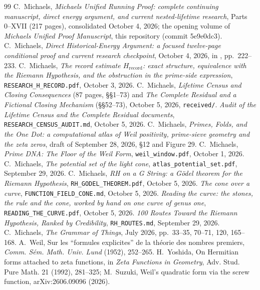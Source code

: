 \documentclass[11pt]{article}
\theoremstyle{definition}
\theoremstyle{remark}
\newcommand{\Hrec}{H_{\mathrm{record}}}
\begin{document}
\begin{thebibliography}{99}\small
{} C.~Michaels, \emph{Michaels Unified Running Proof: complete continuing manuscript, direct energy argument, and current nested-lifetime research}, Parts 0--XVII (217 pages), consolidated October 4, 2026; the opening volume of \emph{Michaels Unified Proof Manuscript}, this repository (commit 5e9e0dc3).
 C.~Michaels, \emph{Direct Historical-Energy Argument: a focused twelve-page conditional proof and current research checkpoint}, October 4, 2026, in \cite{running}, pp.\ 222--233.
 C.~Michaels, \emph{The record estimate $\Hrec$: exact structure, equivalence with the Riemann Hypothesis, and the obstruction in the prime-side expression}, \texttt{RESEARCH\_H\_RECORD.pdf}, October 3, 2026.
 C.~Michaels, \emph{Lifetime Census and Closing Consequences} (87 pages, \S\S1--73) and \emph{The Complete Residual and a Fictional Closing Mechanism} (\S\S52--73), October 5, 2026, \texttt{received/}.
 \emph{Audit of the Lifetime Census and the Complete Residual documents}, \texttt{RESEARCH\_CENSUS\_AUDIT.md}, October 5, 2026.
 C.~Michaels, \emph{Primes, Folds, and the One Dot: a computational atlas of Weil positivity, prime-sieve geometry and the zeta zeros}, draft of September 28, 2026, \S12 and Figure 29.
 C.~Michaels, \emph{Prime DNA: The Floor of the Weil Form}, \texttt{weil\_window.pdf}, October 1, 2026.
 C.~Michaels, \emph{The potential set of the light cone}, \texttt{atlas\_potential\_set.pdf}, September 29, 2026.
 C.~Michaels, \emph{RH on a G String: a Gödel theorem for the Riemann Hypothesis}, \texttt{RH\_GODEL\_THEOREM.pdf}, October 5, 2026.
 \emph{The cone over a curve}, \texttt{FUNCTION\_FIELD\_CONE.md}, October 5, 2026.
 \emph{Reading the curve: the stones, the rule and the cone, worked by hand on one curve of genus one}, \texttt{READING\_THE\_CURVE.pdf}, October 5, 2026.
 \emph{100 Routes Toward the Riemann Hypothesis, Ranked by Credibility}, \texttt{RH\_ROUTES.md}, September 29, 2026.
 C.~Michaels, \emph{The Grammar of Things}, July 2026, pp.\ 33--35, 70--71, 120, 165--168.
 A.~Weil, Sur les ``formules explicites'' de la th\'eorie des nombres premiers, \emph{Comm. S\'em. Math. Univ. Lund} (1952), 252--265.
 H.~Yoshida, On Hermitian forms attached to zeta functions, in \emph{Zeta Functions in Geometry}, Adv. Stud. Pure Math. 21 (1992), 281--325; M.~Suzuki, Weil's quadratic form via the screw function, arXiv:2606.09096 (2026).

\end{thebibliography}
\end{document}
